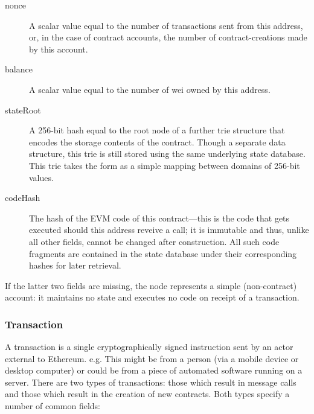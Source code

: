 \documentclass[9pt,oneside]{amsart}
\begin{document}
\begin{multicols}{2}
\begin{description}
\item[nonce] A scalar value equal to the number of transactions sent from this address, or, in the case of contract accounts, the number of contract-creations made by this account.
\item[balance] A scalar value equal to the number of wei owned by this address.
\item[stateRoot] A 256-bit hash equal to the root node of a further trie structure that encodes the storage contents of the contract. Though a separate data structure, this trie is still stored using the same underlying state database. This trie takes the form as a simple mapping between domains of 256-bit values.
\item[codeHash] The hash of the EVM code of this contract---this is the code that gets executed should this address reveive a call; it is immutable and thus, unlike all other fields, cannot be changed after construction. All such code fragments are contained in the state database under their corresponding hashes for later retrieval.
\end{description}

If the latter two fields are missing, the node represents a simple (non-contract) account: it maintains no state and executes no code on receipt of a transaction.

\subsubsection{Transaction} \label{ch:transaction}

A transaction is a single cryptographically signed instruction sent by an actor external to Ethereum. e.g. This might be from a person (via a mobile device or desktop computer) or could be from a piece of automated software running on a server. There are two types of transactions: those which result in message calls and those which result in the creation of new contracts. Both types specify a number of common fields:


\end{multicols}
\end{document}
